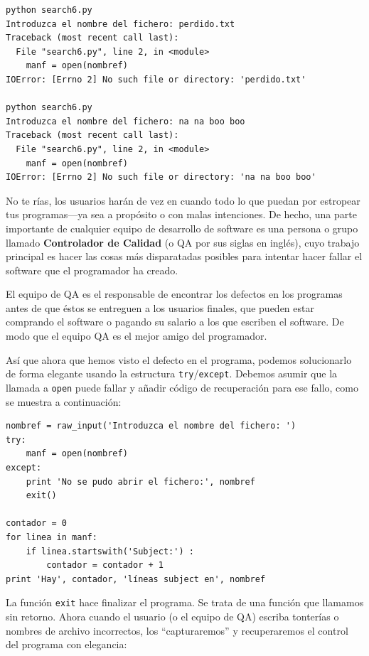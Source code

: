 \beforeverb
\begin{verbatim}
python search6.py 
Introduzca el nombre del fichero: perdido.txt
Traceback (most recent call last):
  File "search6.py", line 2, in <module>
    manf = open(nombref)
IOError: [Errno 2] No such file or directory: 'perdido.txt'

python search6.py 
Introduzca el nombre del fichero: na na boo boo
Traceback (most recent call last):
  File "search6.py", line 2, in <module>
    manf = open(nombref)
IOError: [Errno 2] No such file or directory: 'na na boo boo'
\end{verbatim}
\afterverb
%
No te rías, los usuarios harán de vez en cuando todo lo que puedan por estropear
tus programas---ya sea a propósito o con malas intenciones.
De hecho, una parte importante de cualquier equipo de desarrollo de software
es una persona o grupo llamado {\bf Controlador de Calidad}
(o QA por sus siglas en inglés), cuyo trabajo principal es hacer las cosas más disparatadas
posibles para intentar hacer fallar el software que el programador ha creado.

El equipo de QA es el responsable de encontrar los defectos en los programas antes
de que éstos se entreguen a los usuarios finales, que pueden estar comprando el
software o pagando su salario a los que escriben el software. De modo que el equipo QA
es el mejor amigo del programador.

Así que ahora que hemos visto el defecto en el programa, podemos solucionarlo
de forma elegante usando la estructura {\tt try}/{\tt except}. Debemos asumir que la llamada
a {\tt open} puede fallar y añadir código de recuperación para ese fallo,
como se muestra a continuación:

\beforeverb
\begin{verbatim}
nombref = raw_input('Introduzca el nombre del fichero: ')
try:
    manf = open(nombref)
except:
    print 'No se pudo abrir el fichero:', nombref
    exit()

contador = 0
for linea in manf:
    if linea.startswith('Subject:') : 
        contador = contador + 1
print 'Hay', contador, 'líneas subject en', nombref
\end{verbatim}
\afterverb
%
La función {\tt exit} hace finalizar el programa. Se trata de una función
que llamamos sin retorno. Ahora cuando el usuario (o
el equipo de QA) escriba tonterías o nombres de archivo incorrectos,
los ``capturaremos'' y recuperaremos el control del programa con elegancia:

